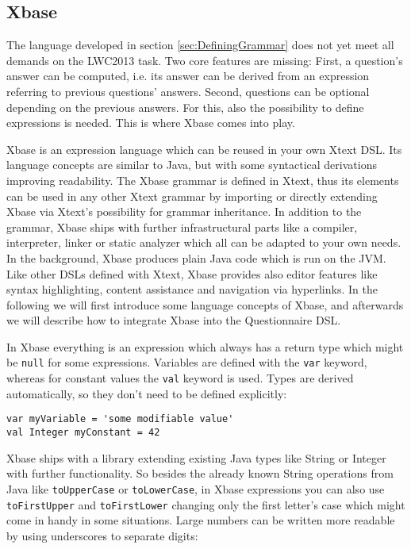 \subsection{Xbase}

The language developed in section \ref{sec:DefiningGrammar} does not yet meet all 
demands on the LWC2013 task. Two core features are missing: First, a question's 
answer can be computed, i.e. its answer can be derived from an expression referring 
to previous questions' answers. Second, questions can be optional depending on the 
previous answers. For this, also the possibility to define expressions is needed. This
is where Xbase comes into play.

Xbase is an expression language which can be reused in your own Xtext DSL. Its language
concepts are similar to Java, but with some syntactical derivations improving readability.
The Xbase grammar is defined in Xtext, thus its elements can be used in any other Xtext grammar
by importing or directly extending Xbase via Xtext's possibility for grammar inheritance.
In addition to the grammar, Xbase ships with further infrastructural parts like a compiler, 
interpreter, linker or static analyzer which all can be adapted to your own needs. In
the background, Xbase produces plain Java code which is run on the JVM. Like
other DSLs defined with Xtext, Xbase provides also editor features like syntax highlighting, 
content assistance and navigation via hyperlinks. In the following we will first introduce
some language concepts of Xbase, and afterwards we will describe how to integrate Xbase
into the Questionnaire DSL.

In Xbase everything is an expression which always has a return type which might be \texttt{null} 
for some expressions. Variables are defined with the \texttt{var} keyword, whereas for 
constant values the \texttt{val} keyword is used. Types are derived automatically, so they 
don't need to be defined explicitly:

\begin{lstlisting}[language=Xbase]
var myVariable = 'some modifiable value'
val Integer myConstant = 42  
\end{lstlisting}

Xbase ships with a library extending existing Java types like String or Integer with further 
functionality. So besides the already known String operations from Java like 
\texttt{toUpperCase} or \texttt{toLowerCase}, in Xbase expressions you can also use \texttt{toFirstUpper}
and \texttt{toFirstLower} changing only the first letter's case which might come in handy 
in some situations. Large numbers can be written more readable by using underscores to
separate digits:

